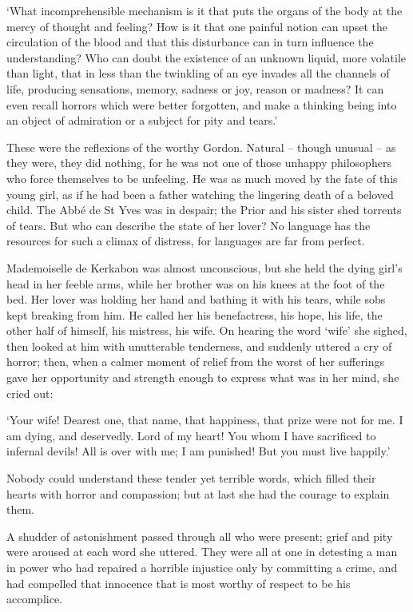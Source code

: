 \documentclass{article}
\begin{document}
\begin{center}
`What incomprehensible mechanism is it that puts the organs of the body at the 
mercy of thought and feeling? How is it that one painful notion can upset the circulation 
of the blood and that this disturbance can in turn influence the understanding? 
Who can doubt the existence of an unknown liquid, more volatile than light, that 
in less than the twinkling of an eye invades all the channels of life, producing 
sensations, memory, sadness or joy, reason or madness? It can even recall horrors 
which were better forgotten, and make a thinking being into an object of admiration 
or a subject for pity and tears.' 

These were the reflexions of the worthy Gordon. Natural – though unusual – 
as they were, they did nothing, for he was not one of those unhappy philosophers 
who force themselves to be unfeeling. He was as much moved by the fate of this 
young girl, as if he had been a father watching the lingering death of a beloved 
child. The Abbé de St Yves was in despair; the Prior and his sister shed torrents 
of tears. But who can describe the state of her lover? No language has the resources 
for such a climax of distress, for languages are far from perfect. 

Mademoiselle de Kerkabon was almost unconscious, but she held the dying girl's 
head in her feeble arms, while her brother was on his knees at the foot of the 
bed. Her lover was holding her hand and bathing it with his tears, while sobs kept 
breaking from him. He called her his benefactress, his hope, his life, the other 
half of himself, his mistress, his wife. On hearing the word `wife' she sighed, 
then looked at him with unutterable tenderness, and suddenly uttered a cry of horror; 
then, when a calmer moment of relief from the worst of her sufferings gave her 
opportunity and strength enough to express what was in her mind, she cried out: 

`Your wife! Dearest one, that name, that happiness, that prize were not for me. 
I am dying, and deservedly. Lord of my heart! You whom I have sacrificed to infernal 
devils! All is over with me; I am punished! But you must live happily.' 

Nobody could understand these tender yet terrible words, which filled their hearts 
with horror and compassion; but at last she had the courage to explain them. 

A shudder of astonishment passed through all who were present; grief and pity were 
aroused at each word she uttered. They were all at one in detesting a man in power 
who had repaired a horrible injustice only by committing a crime, and had compelled 
that innocence that is most worthy of respect to be his accomplice. 


\end{center}
\end{document}
